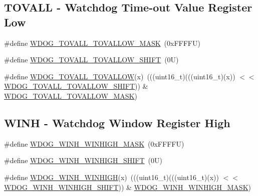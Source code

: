 \subsection*{T\+O\+V\+A\+LL -\/ Watchdog Time-\/out Value Register Low}
\begin{DoxyCompactItemize}
\item 
\#define \mbox{\hyperlink{group___w_d_o_g___register___masks_ga71c3913b6be99b211a3c3031caf8ac66}{W\+D\+O\+G\+\_\+\+T\+O\+V\+A\+L\+L\+\_\+\+T\+O\+V\+A\+L\+L\+O\+W\+\_\+\+M\+A\+SK}}~(0x\+F\+F\+F\+F\+U)
\item 
\#define \mbox{\hyperlink{group___w_d_o_g___register___masks_ga57ba2617b2855cd4b3d1eb0b3c878f52}{W\+D\+O\+G\+\_\+\+T\+O\+V\+A\+L\+L\+\_\+\+T\+O\+V\+A\+L\+L\+O\+W\+\_\+\+S\+H\+I\+FT}}~(0\+U)
\item 
\#define \mbox{\hyperlink{group___w_d_o_g___register___masks_gae42e2ff7aef835ab2b6fa0d6f7a33476}{W\+D\+O\+G\+\_\+\+T\+O\+V\+A\+L\+L\+\_\+\+T\+O\+V\+A\+L\+L\+OW}}(x)~(((uint16\+\_\+t)(((uint16\+\_\+t)(x)) $<$$<$ \mbox{\hyperlink{group___w_d_o_g___register___masks_ga57ba2617b2855cd4b3d1eb0b3c878f52}{W\+D\+O\+G\+\_\+\+T\+O\+V\+A\+L\+L\+\_\+\+T\+O\+V\+A\+L\+L\+O\+W\+\_\+\+S\+H\+I\+FT}})) \& \mbox{\hyperlink{group___w_d_o_g___register___masks_ga71c3913b6be99b211a3c3031caf8ac66}{W\+D\+O\+G\+\_\+\+T\+O\+V\+A\+L\+L\+\_\+\+T\+O\+V\+A\+L\+L\+O\+W\+\_\+\+M\+A\+SK}})
\end{DoxyCompactItemize}
\subsection*{W\+I\+NH -\/ Watchdog Window Register High}
\begin{DoxyCompactItemize}
\item 
\#define \mbox{\hyperlink{group___w_d_o_g___register___masks_ga6efef6fddbc8b8600a8dee5a24659068}{W\+D\+O\+G\+\_\+\+W\+I\+N\+H\+\_\+\+W\+I\+N\+H\+I\+G\+H\+\_\+\+M\+A\+SK}}~(0x\+F\+F\+F\+F\+U)
\item 
\#define \mbox{\hyperlink{group___w_d_o_g___register___masks_ga362e7a13b632027b940135991c9d169b}{W\+D\+O\+G\+\_\+\+W\+I\+N\+H\+\_\+\+W\+I\+N\+H\+I\+G\+H\+\_\+\+S\+H\+I\+FT}}~(0\+U)
\item 
\#define \mbox{\hyperlink{group___w_d_o_g___register___masks_gaf5dc50c489d2700bf95ffdfa849f9e24}{W\+D\+O\+G\+\_\+\+W\+I\+N\+H\+\_\+\+W\+I\+N\+H\+I\+GH}}(x)~(((uint16\+\_\+t)(((uint16\+\_\+t)(x)) $<$$<$ \mbox{\hyperlink{group___w_d_o_g___register___masks_ga362e7a13b632027b940135991c9d169b}{W\+D\+O\+G\+\_\+\+W\+I\+N\+H\+\_\+\+W\+I\+N\+H\+I\+G\+H\+\_\+\+S\+H\+I\+FT}})) \& \mbox{\hyperlink{group___w_d_o_g___register___masks_ga6efef6fddbc8b8600a8dee5a24659068}{W\+D\+O\+G\+\_\+\+W\+I\+N\+H\+\_\+\+W\+I\+N\+H\+I\+G\+H\+\_\+\+M\+A\+SK}})
\end{DoxyCompactItemize}
